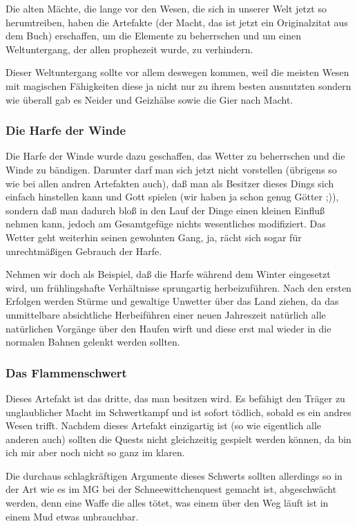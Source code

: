 \documentclass[10pt,a4paper,oneside,onecolumn]{article}
\begin{document}
Die alten Mächte, die lange vor den Wesen, die sich in unserer Welt
jetzt so herumtreiben, haben die Artefakte (der Macht, das ist jetzt
ein Originalzitat aus dem Buch) erschaffen, um die Elemente zu beherrschen
und um einen Weltuntergang, der allen prophezeit wurde, zu verhindern.

Dieser Weltuntergang sollte vor allem deswegen kommen, weil die meisten
Wesen mit magischen Fähigkeiten diese ja nicht nur zu ihrem besten
ausnutzten sondern wie überall gab es Neider und Geizhälse sowie die
Gier nach Macht.


\subsubsection{Die Harfe der Winde}

Die Harfe der Winde wurde dazu geschaffen, das Wetter zu beherrschen
und die Winde zu bändigen. Darunter darf man sich jetzt nicht vorstellen
(übrigens so wie bei allen andren Artefakten auch), daß man als Besitzer
dieses Dings sich einfach hinstellen kann und Gott spielen (wir haben
ja schon genug Götter ;)), sondern daß man dadurch bloß in den Lauf
der Dinge einen kleinen Einfluß nehmen kann, jedoch am Gesamtgefüge
nichts wesentliches modifiziert. Das Wetter geht weiterhin seinen
gewohnten Gang, ja, rächt sich sogar für unrechtmäßigen Gebrauch der
Harfe.

Nehmen wir doch als Beispiel, daß die Harfe während dem Winter eingesetzt
wird, um frühlingshafte Verhältnisse sprungartig herbeizuführen. Nach
den ersten Erfolgen werden Stürme und gewaltige Unwetter über das
Land ziehen, da das unmittelbare absichtliche Herbeiführen einer neuen
Jahreszeit natürlich alle natürlichen Vorgänge über den Haufen wirft
und diese erst mal wieder in die normalen Bahnen gelenkt werden sollten.


\subsubsection{Das Flammenschwert}

Dieses Artefakt ist das dritte, das man besitzen wird. Es befähigt
den Träger zu unglaublicher Macht im Schwertkampf und ist sofort tödlich,
sobald es ein andres Wesen trifft. Nachdem dieses Artefakt einzigartig
ist (so wie eigentlich alle anderen auch) sollten die Quests nicht
gleichzeitig gespielt werden können, da bin ich mir aber noch nicht
so ganz im klaren.

Die durchaus schlagkräftigen Argumente dieses Schwerts sollten allerdings
so in der Art wie es im MG bei der Schneewittchenquest gemacht ist,
abgeschwächt werden, denn eine Waffe die alles tötet, was einem über
den Weg läuft ist in einem Mud etwas unbrauchbar.
\end{document}
